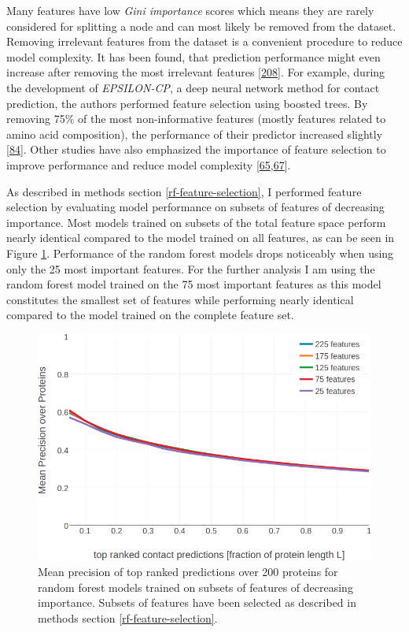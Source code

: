 \documentclass[11pt,a4paper,twoside]{book}
\theoremstyle{definition}
\theoremstyle{definition}
\theoremstyle{remark}
\begin{document}
Many features have low \emph{Gini importance} scores which means they
are rarely considered for splitting a node and can most likely be
removed from the dataset. Removing irrelevant features from the dataset
is a convenient procedure to reduce model complexity. It has been found,
that prediction performance might even increase after removing the most
irrelevant features {[}\protect\hyperlink{ref-Menze2009}{208}{]}. For
example, during the development of \emph{EPSILON-CP}, a deep neural
network method for contact prediction, the authors performed feature
selection using boosted trees. By removing 75\% of the most
non-informative features (mostly features related to amino acid
composition), the performance of their predictor increased slightly
{[}\protect\hyperlink{ref-Stahl2017}{84}{]}. Other studies have also
emphasized the importance of feature selection to improve performance
and reduce model complexity
{[}\protect\hyperlink{ref-Cheng2007}{65},\protect\hyperlink{ref-Li2011}{67}{]}.

As described in methods section \ref{rf-feature-selection}, I performed
feature selection by evaluating model performance on subsets of features
of decreasing importance. Most models trained on subsets of the total
feature space perform nearly identical compared to the model trained on
all features, as can be seen in Figure
\ref{fig:rf-feature-selection-performance}. Performance of the random
forest models drops noticeably when using only the 25 most important
features. For the further analysis I am using the random forest model
trained on the 75 most important features as this model constitutes the
smallest set of features while performing nearly identical compared to
the model trained on the complete feature set.







\begin{figure}
\includegraphics[width=1\linewidth]{img/random_forest_contact_prior/precision_vs_rank_featureselection_random_forest_optimized_hyperparameters} \caption{Mean precision of top
ranked predictions over 200 proteins for random forest models trained on
subsets of features of decreasing importance. Subsets of features have
been selected as described in methods section
\ref{rf-feature-selection}.}\label{fig:rf-feature-selection-performance}
\end{figure}
\end{document}
